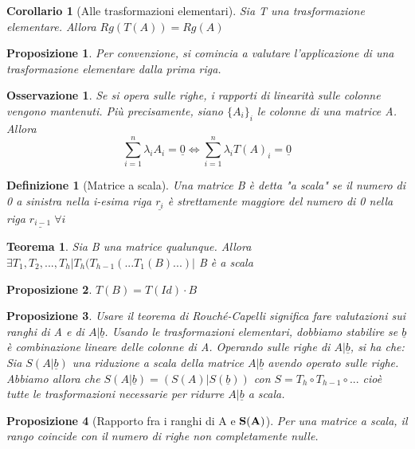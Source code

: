 \documentclass[12pt]{article}
\newenvironment{para}{\begin{adjustwidth}{13mm}{}}{\end{adjustwidth}}
\newtheorem{Definizione}{Definizione}[subsection]
\newtheorem{Corollario}{Corollario}[subsection]
\newtheorem{Teorema}{Teorema}[subsection]
\newtheorem{Proposizione}{Proposizione}[subsection]
\newtheorem{Osservazione}{Osservazione}[subsection]
\begin{document}
\begin{para}
\begin{Corollario} [Alle trasformazioni elementari]
Sia T una trasformazione elementare. Allora $Rg(T(A)) = Rg(A)$
\end{Corollario}
\begin{Proposizione}
Per convenzione, si comincia a valutare l'applicazione di una trasformazione elementare dalla prima riga.
\end{Proposizione}
\begin{Osservazione}
Se si opera sulle righe, i rapporti di linearità sulle colonne vengono mantenuti. Più precisamente, siano $\{A_i\}_i$ le colonne di una matrice A. Allora $$\sum_{i=1}^n{\lambda_i A_i} = \underline{0} \Leftrightarrow \sum_{i=1}^n{\lambda_i T(A)_i} = \underline{0}$$
\end{Osservazione}

\begin{Definizione}[Matrice a scala]
Una matrice B è detta "a scala" se il numero di 0 a sinistra nella i-esima riga $\underline{r_i}$ è strettamente maggiore del numero di 0 nella riga $\underline{r_{i-1}} \; \forall i$
\end{Definizione}

\begin{Teorema}
Sia B una matrice qualunque. Allora $\exists T_1,T_2,...,T_h | T_h(T_{h-1}(...T_1(B)...) |$ B è a scala
\end{Teorema}

\begin{Proposizione}
   $T(B) = T(Id) \cdot B$ 
\end{Proposizione}

\begin{Proposizione}
Usare il teorema di Rouché-Capelli significa fare valutazioni sui ranghi di A e di $A|\underline{b}$. Usando le trasformazioni elementari, dobbiamo stabilire se $\underline{b}$ è combinazione lineare delle colonne di A. Operando sulle righe di $A|\underline{b}$, si ha che: Sia $S(A|\underline{b})$ una riduzione a scala della matrice $A|\underline{b}$ avendo operato sulle righe. Abbiamo allora che $S(A|\underline{b}) = (S(A) | S(\underline{b}))$ con $S = T_h \circ T_{h-1} \circ ...$ cioè tutte le trasformazioni necessarie per ridurre $A|\underline{b}$ a scala.
\end{Proposizione}

\begin{Proposizione}[Rapporto fra i ranghi di A e $\bold{S(A)}$]
Per una matrice a scala, il rango coincide con il numero di righe non completamente nulle.
\end{Proposizione}


\end{para}
\end{document}
